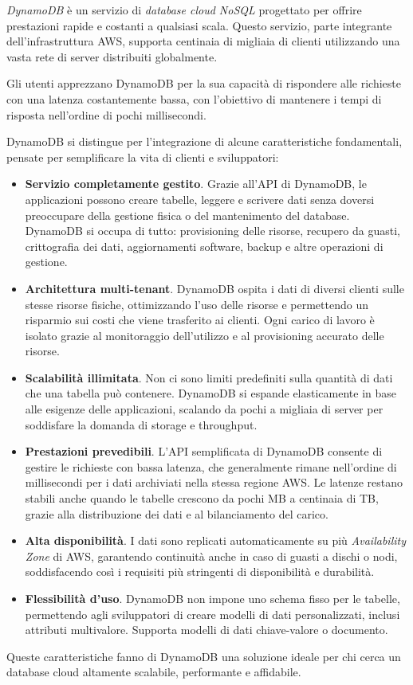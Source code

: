 \textit{DynamoDB} è un servizio di \textit{database cloud NoSQL} progettato per offrire prestazioni rapide e costanti a qualsiasi scala. Questo servizio, parte integrante dell'infrastruttura AWS, supporta centinaia di migliaia di clienti utilizzando una vasta rete di server distribuiti globalmente.

Gli utenti apprezzano DynamoDB per la sua capacità di rispondere alle richieste con una latenza costantemente bassa, con l'obiettivo di mantenere i tempi di risposta nell'ordine di pochi millisecondi.

DynamoDB si distingue per l'integrazione di alcune caratteristiche fondamentali, pensate per semplificare la vita di clienti e sviluppatori:
\begin{itemize}
    \item \textbf{Servizio completamente gestito}. Grazie all'API di DynamoDB, le applicazioni possono creare tabelle, leggere e scrivere dati senza doversi preoccupare della gestione fisica o del mantenimento del database. DynamoDB si occupa di tutto: provisioning delle risorse, recupero da guasti, crittografia dei dati, aggiornamenti software, backup e altre operazioni di gestione.
    \item \textbf{Architettura multi-tenant}. DynamoDB ospita i dati di diversi clienti sulle stesse risorse fisiche, ottimizzando l'uso delle risorse e permettendo un risparmio sui costi che viene trasferito ai clienti. Ogni carico di lavoro è isolato grazie al monitoraggio dell'utilizzo e al provisioning accurato delle risorse.
    \item \textbf{Scalabilità illimitata}. Non ci sono limiti predefiniti sulla quantità di dati che una tabella può contenere. DynamoDB si espande elasticamente in base alle esigenze delle applicazioni, scalando da pochi a migliaia di server per soddisfare la domanda di storage e throughput.
    \item \textbf{Prestazioni prevedibili}. L'API semplificata di DynamoDB consente di gestire le richieste con bassa latenza, che generalmente rimane nell'ordine di millisecondi per i dati archiviati nella stessa regione AWS. Le latenze restano stabili anche quando le tabelle crescono da pochi MB a centinaia di TB, grazie alla distribuzione dei dati e al bilanciamento del carico.
    \item \textbf{Alta disponibilità}. I dati sono replicati automaticamente su più \textit{Availability Zone} di AWS, garantendo continuità anche in caso di guasti a dischi o nodi, soddisfacendo così i requisiti più stringenti di disponibilità e durabilità.
    \item \textbf{Flessibilità d'uso}. DynamoDB non impone uno schema fisso per le tabelle, permettendo agli sviluppatori di creare modelli di dati personalizzati, inclusi attributi multivalore. Supporta modelli di dati chiave-valore o documento.
\end{itemize}
Queste caratteristiche fanno di DynamoDB una soluzione ideale per chi cerca un database cloud altamente scalabile, performante e affidabile.\cite{elhemaliamazon}